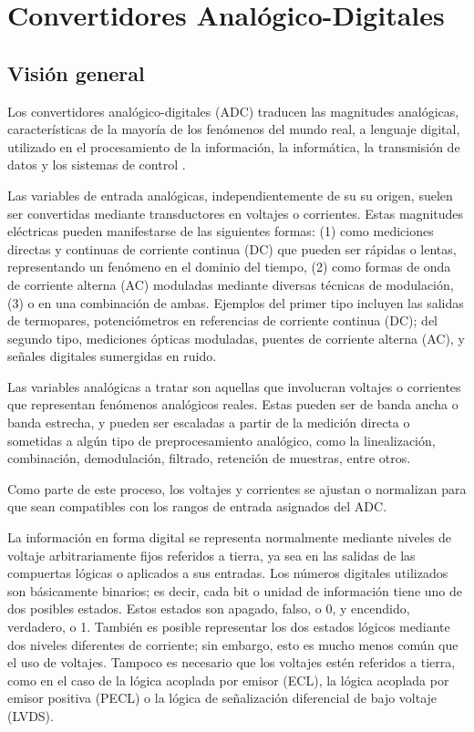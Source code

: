   \section{Convertidores Analógico-Digitales}

    \subsection{Visión general}

    Los convertidores analógico-digitales (ADC) traducen las magnitudes analógicas, características de la mayoría de los fenómenos del mundo real, a lenguaje digital, utilizado en el procesamiento de la información, la informática, la transmisión de datos y los sistemas de control \cite{Kester2007}.

    Las variables de entrada analógicas, independientemente de su su origen, suelen ser convertidas mediante transductores en voltajes o corrientes. Estas magnitudes eléctricas pueden manifestarse de las siguientes formas: (1) como mediciones directas y continuas de corriente continua (DC) que pueden ser rápidas o lentas, representando un fenómeno en el dominio del tiempo, (2) como formas de onda de corriente alterna (AC) moduladas mediante diversas técnicas de modulación, (3) o en una combinación de ambas. Ejemplos del primer tipo incluyen las salidas de termopares, potenciómetros en referencias de corriente continua (DC); del segundo tipo, mediciones ópticas moduladas, puentes de corriente alterna (AC), y señales digitales sumergidas en ruido.

    Las variables analógicas a tratar son aquellas que involucran voltajes o corrientes que representan fenómenos analógicos reales. Estas pueden ser de banda ancha o banda estrecha, y pueden ser escaladas a partir de la medición directa o sometidas a algún tipo de preprocesamiento analógico, como la linealización, combinación, demodulación, filtrado, retención de muestras, entre otros.

    Como parte de este proceso, los voltajes y corrientes se ajustan o normalizan para que sean compatibles con los rangos de entrada asignados del ADC.

    La información en forma digital se representa normalmente mediante niveles de voltaje arbitrariamente fijos referidos a tierra, ya sea en las salidas de las compuertas lógicas o aplicados a sus entradas. Los números digitales utilizados son básicamente binarios; es decir, cada bit o unidad de información tiene uno de dos posibles estados. Estos estados son apagado, falso, o 0, y encendido, verdadero, o 1. También es posible representar los dos estados lógicos mediante dos niveles diferentes de corriente; sin embargo, esto es mucho menos común que el uso de voltajes. Tampoco es necesario que los voltajes estén referidos a tierra, como en el caso de la lógica acoplada por emisor (ECL), la lógica acoplada por emisor positiva (PECL) o la lógica de señalización diferencial de bajo voltaje (LVDS).

